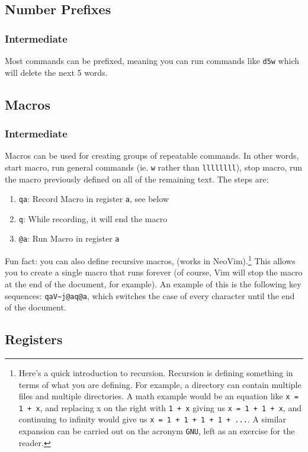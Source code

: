 \documentclass[11pt]{article}
\begin{document}
\subsection{Number Prefixes}
\label{sec:orgd4c0faa}
\subsubsection{Intermediate}
\label{sec:org460745a}
Most commands can be prefixed, meaning you can run commands like \texttt{d5w} which
will delete the next 5 words.
\subsection{Macros}
\label{sec:org3972ac1}
\subsubsection{Intermediate}
\label{sec:org352a150}
Macros can be used for creating groups of repeatable commands. In other words,
start macro, run general commands (ie. \texttt{w} rather than \texttt{llllllll}), stop macro,
run the macro previously defined on all of the remaining text. The steps are:

\begin{enumerate}
\item \texttt{qa}: Record Macro in register \texttt{a}, see below
\item \texttt{q}: While recording, it will end the macro
\item \texttt{@a}: Run Macro in register \texttt{a}
\end{enumerate}

Fun fact: you can also define recursive macros, (works in NeoVim).\footnote{Here's a quick introduction to recursion. Recursion is defining something
in terms of what you are defining. For example, a directory can contain multiple
files and multiple directories. A math example would be an equation like \texttt{x =
1 + x}, and replacing x on the right with \texttt{1 + x} giving us \texttt{x = 1 + 1 + x}, and
continuing to infinity would give us \texttt{x = 1 + 1 + 1 + 1 + ...}. A similar
expansion can be carried out on the acronym \texttt{GNU}, left as an exercise for the
reader.} This
allows you to create a single macro that runs forever (of course, Vim will stop
the macro at the end of the document, for example). An example of this is the
following key sequences: \texttt{qaV\textasciitilde{}j@aq@a}, which switches the case of every character
until the end of the document.
\subsection{Registers}
\label{sec:org0f8763c}
\end{document}

